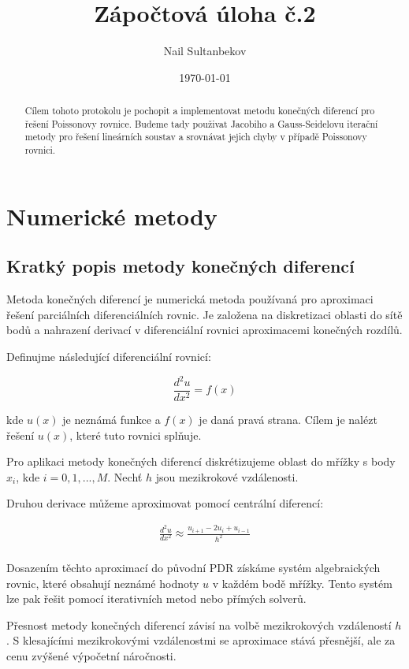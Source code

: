 \documentclass{article}
\title{Zápočtová úloha č.2}
\author{Nail Sultanbekov}
\date{\today}
\begin{document}
\maketitle
\begin{abstract} 
    Cílem tohoto protokolu je pochopit a implementovat metodu konečných diferencí pro řešení Poissonovy rovnice. 
    Budeme tady použivat Jacobiho a Gauss-Seidelovu iterační metody pro řešení lineárních soustav a srovnávat 
    jejich chyby v případě Poissonovy rovnici.
\end{abstract}
\section*{Numerické metody}
\subsection*{Kratký popis metody konečných diferencí}
Metoda konečných diferencí je numerická metoda používaná pro aproximaci řešení 
parciálních diferenciálních rovnic. Je založena na diskretizaci oblasti do sítě 
bodů a nahrazení derivací v diferenciální rovnici aproximacemi konečných rozdílů.

Definujme následující diferenciální rovnicí:

\begin{equation*}
\frac{d^2 u}{d x^2}= f(x)
\end{equation*}

kde $u(x)$ je neznámá funkce a $f(x)$ je daná pravá strana. 
Cílem je nalézt řešení $u(x)$, které tuto rovnici splňuje.

Pro aplikaci metody konečných diferencí diskrétizujeme oblast do mřížky s body $x_i$, 
kde $i = 0, 1, ..., M$.
Nechť $h$ jsou mezikrokové vzdálenosti.

Druhou derivace můžeme aproximovat pomocí centrální diferencí:

\begin{align*}
\frac{d^2 u}{d x^2} \approx \frac{u_{i+1} - 2u_i + u_{i-1}}{h^2} \\
\end{align*}

Dosazením těchto aproximací do původní PDR získáme systém algebraických rovnic, 
které obsahují neznámé hodnoty $u$ v každém bodě mřížky. 
Tento systém lze pak řešit pomocí iterativních metod nebo přímých solverů.

Přesnost metody konečných diferencí závisí na volbě mezikrokových vzdáleností $h$.
S klesajícími mezikrokovými vzdálenostmi se aproximace stává přesnější, 
ale za cenu zvýšené výpočetní náročnosti.
\end{document}
